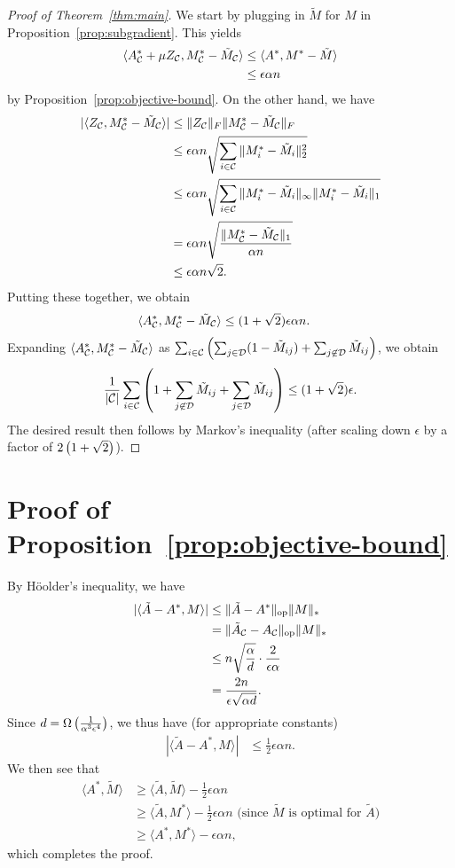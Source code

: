\documentclass[11pt]{article}
\newcommand{\M}{\tilde{M}}
\newcommand{\Mm}{M^*}
\newcommand{\A}{\tilde{A}}
\newcommand{\Aa}{A^*}
\newcommand{\sD}{\mathcal{D}}
\begin{document}
\begin{proof}[Proof of Theorem~\ref{thm:main}]
We start by plugging in $\M$ for $M$ in Proposition~\ref{prop:subgradient}. This yields
\begin{align}
\langle \Aa_{\sC} + \mu Z_{\sC}, \Mm_{\sC} - \M_{\sC} \rangle &\leq \langle \Aa, \Mm - \M \rangle \\
 &\leq \epsilon \alpha n
\end{align}
by Proposition~\ref{prop:objective-bound}.
On the other hand, we have 
\begin{align}
|\langle Z_{\sC}, \Mm_{\sC} - \M_{\sC} \rangle| &\leq \|Z_{\sC}\|_F\|\Mm_{\sC} - \M_{\sC}\|_F \\
 &\leq \epsilon\alpha n \sqrt{\sum_{i \in \sC} \|\Mm_i - \M_i\|_2^2} \\
 &\leq \epsilon\alpha n \sqrt{\sum_{i \in \sC} \|\Mm_i - \M_i\|_{\infty}\|\Mm_i - \M_i\|_1} \\
 &= \epsilon\alpha n \sqrt{\frac{\|\Mm_{\sC}-\M_{\sC}\|_1}{\alpha n}} \\
 &\leq \epsilon\alpha n \sqrt{2}.
\end{align}
Putting these together, we obtain
\begin{align}
\langle \Aa_{\sC}, \Mm_{\sC} - \M_{\sC} \rangle &\leq (1+\sqrt{2})\epsilon \alpha n.
\end{align}
Expanding $\langle \Aa_{\sC}, \Mm_{\sC} - \M_{\sC} \rangle$ as 
$\sum_{i \in \sC}\p{\sum_{j \in \sD} (1 - \M_{ij}) + \sum_{j \not\in \sD} \M_{ij}}$, 
we obtain 
\[ \frac{1}{|\sC|}\sum_{i \in \sC}\p{1 + \sum_{j\not\in \sD} \M_{ij} + \sum_{j \in \sD} \M_{ij}} \leq (1+\sqrt{2})\epsilon. \]
The desired result then follows by Markov's inequality (after scaling down $\epsilon$ by a factor of $2\left(1+\sqrt{2}\right)$).
\end{proof}

\section{Proof of Proposition~\ref{prop:objective-bound}}
By H\"{o}older's inequality, we have 
\begin{align}
|\langle \A-\Aa, M \rangle| &\leq \|\A-\Aa\|_{\op}\|M\|_* \\
 &= \|\A_{\sC}-A_{\sC}\|_{\op}\|M\|_* \\
 &\leq n\sqrt{\frac{\alpha}{d}} \cdot \frac{2}{\epsilon\alpha} \\
 &= \frac{2n}{\epsilon\sqrt{\alpha d}}.
\end{align}
Since $d = \Omega\left(\frac{1}{\alpha^3\epsilon^4}\right)$, we thus have (for appropriate constants)
\begin{align}
|\langle \A-\Aa, M \rangle| &\leq \frac{1}{2}\epsilon \alpha n.
\end{align}
We then see that
\begin{align}
\langle \Aa, \M \rangle  &\geq \langle \A, \M \rangle - \frac{1}{2}\epsilon \alpha n \\
 &\geq \langle \A, \Mm \rangle - \frac{1}{2} \epsilon \alpha n \text{ (since $\M$ is optimal for $\A$)} \\
 &\geq \langle \Aa, \Mm \rangle - \epsilon \alpha n,
\end{align}
which completes the proof.
\end{document}
